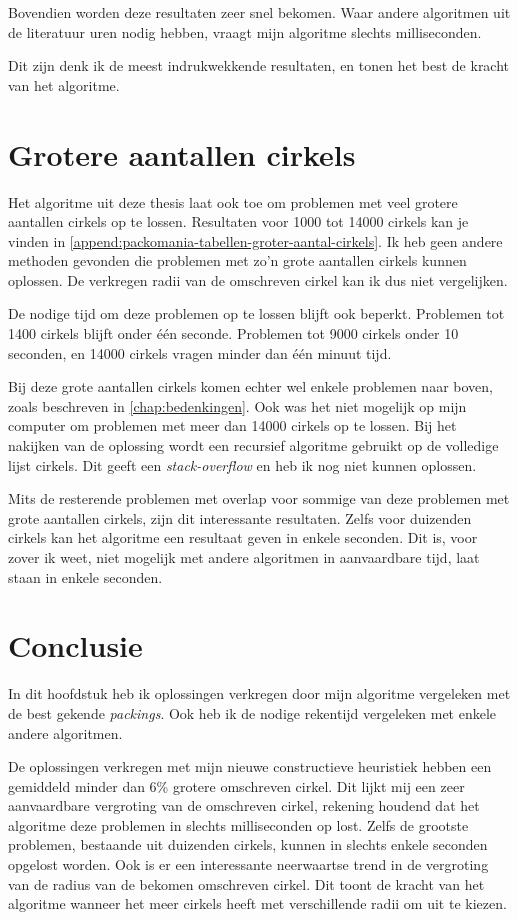 \documentclass[12pt,a4paper,oneside]{book}
\begin{document}
{Bovendien worden deze resultaten zeer snel bekomen.
Waar andere algoritmen uit de literatuur uren nodig hebben, vraagt mijn algoritme slechts milliseconden.

Dit zijn denk ik de meest indrukwekkende resultaten, en tonen het best de kracht van het algoritme.

\section{Grotere aantallen cirkels}

Het algoritme uit deze thesis laat ook toe om problemen met veel grotere aantallen cirkels op te lossen.
Resultaten voor 1000 tot 14000 cirkels kan je vinden in \autoref{append:packomania-tabellen-groter-aantal-cirkels}.
Ik heb geen andere methoden gevonden die problemen met zo'n grote aantallen cirkels kunnen oplossen.
De verkregen radii van de omschreven cirkel kan ik dus niet vergelijken.

De nodige tijd om deze problemen op te lossen blijft ook beperkt.
Problemen tot 1400 cirkels blijft onder één seconde.
Problemen tot 9000 cirkels onder 10 seconden, en 14000 cirkels vragen minder dan één minuut tijd.

Bij deze grote aantallen cirkels komen echter wel enkele problemen naar boven, zoals beschreven in \autoref{chap:bedenkingen}.
Ook was het niet mogelijk op mijn computer om problemen met meer dan 14000 cirkels op te lossen.
Bij het nakijken van de oplossing wordt een recursief algoritme gebruikt op de volledige lijst cirkels.
Dit geeft een \textit{stack-overflow} en heb ik nog niet kunnen oplossen.

Mits de resterende problemen met overlap voor sommige van deze problemen met grote aantallen cirkels, zijn dit interessante resultaten.
Zelfs voor duizenden cirkels kan het algoritme een resultaat geven in enkele seconden.
Dit is, voor zover ik weet, niet mogelijk met andere algoritmen in aanvaardbare tijd, laat staan in enkele seconden.

\section{Conclusie}

In dit hoofdstuk heb ik oplossingen verkregen door mijn algoritme vergeleken met de best gekende \textit{packings}.
Ook heb ik de nodige rekentijd vergeleken met enkele andere algoritmen.

De oplossingen verkregen met mijn nieuwe constructieve heuristiek hebben een gemiddeld minder dan 6\% grotere omschreven cirkel.
Dit lijkt mij een zeer aanvaardbare vergroting van de omschreven cirkel, rekening houdend dat het algoritme deze problemen in slechts milliseconden op lost.
Zelfs de grootste problemen, bestaande uit duizenden cirkels, kunnen in slechts enkele seconden opgelost worden.
Ook is er een interessante neerwaartse trend in de vergroting van de radius van de bekomen omschreven cirkel.
Dit toont de kracht van het algoritme wanneer het meer cirkels heeft met verschillende radii om uit te kiezen.

}
\end{document}
